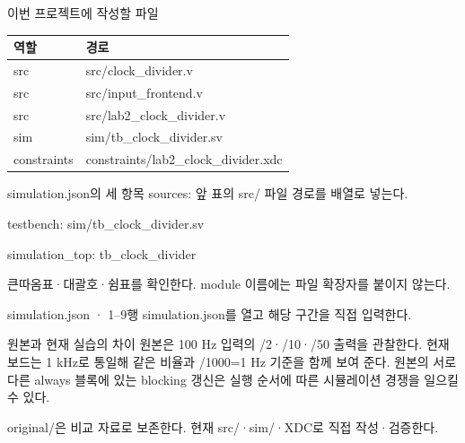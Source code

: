 \begin{frame}{이번 프로젝트에 작성할 파일}
\small
\begin{center}\renewcommand{\arraystretch}{1.55}\begin{tabular}{ll}
역할 & 경로\\\hline
src & src/clock\_divider.v\\
src & src/input\_frontend.v\\
src & src/lab2\_clock\_divider.v\\
sim & sim/tb\_clock\_divider.sv\\
constraints & constraints/lab2\_clock\_divider.xdc\\
\end{tabular}\end{center}
\end{frame}

\begin{frame}{simulation.json의 세 항목}
\small
sources: 앞 표의 src/ 파일 경로를 배열로 넣는다.\par\vspace{0.26cm}testbench: sim/tb\_clock\_divider.sv\par\vspace{0.26cm}simulation\_top: tb\_clock\_divider\par\vspace{0.26cm}큰따옴표·대괄호·쉼표를 확인한다. module 이름에는 파일 확장자를 붙이지 않는다.\par
\end{frame}

\begin{frame}{simulation.json · 1–9행}
\small
simulation.json를 열고 해당 구간을 직접 입력한다.\par\vspace{0.4cm}\par\vspace{0.4cm}
\end{frame}

\begin{frame}{원본과 현재 실습의 차이}
\small
원본은 100 Hz 입력의 /2·/10·/50 출력을 관찰한다. 현재 보드는 1 kHz로 통일해 같은 비율과 /1000=1 Hz 기준을 함께 보여 준다. 원본의 서로 다른 always 블록에 있는 blocking 갱신은 실행 순서에 따른 시뮬레이션 경쟁을 일으킬 수 있다.\par\vspace{0.26cm}original/은 비교 자료로 보존한다. 현재 src/·sim/·XDC로 직접 작성·검증한다.\par
\end{frame}

